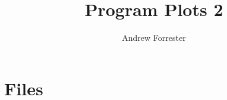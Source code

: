 \documentclass[11pt]{article}
\title{Program Plots 2}
\author{Andrew Forrester}
\begin{document}
\maketitle
\tableofcontents

\section{Files}

\end{document}
